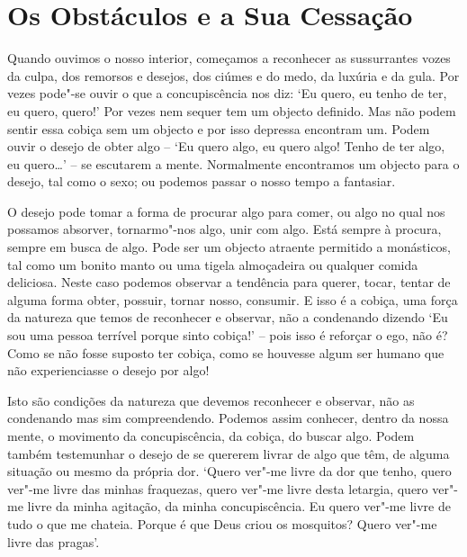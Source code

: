 \chapter{Os Obstáculos e a Sua Cessação}

Quando ouvimos o nosso interior, começamos a reconhecer as sussurrantes
vozes da culpa, dos remorsos e desejos, dos ciúmes e do medo, da luxúria
e da gula. Por vezes pode"-se ouvir o que a concupiscência nos diz: `Eu
quero, eu tenho de ter, eu quero, quero!' Por vezes nem sequer tem um
objecto definido. Mas não podem sentir essa cobiça sem um objecto e por
isso depressa encontram um. Podem ouvir o desejo de obter algo -- `Eu
quero algo, eu quero algo! Tenho de ter algo, eu quero\ldots{}' -- se
escutarem a mente. Normalmente encontramos um objecto para o desejo, tal
como o sexo; ou podemos passar o nosso tempo a fantasiar.

O desejo pode tomar a forma de procurar algo para comer, ou algo no qual
nos possamos absorver, tornarmo"-nos algo, unir com algo. Está sempre à
procura, sempre em busca de algo. Pode ser um objecto atraente permitido
a monásticos, tal como um bonito manto ou uma tigela almoçadeira ou
qualquer comida deliciosa. Neste caso podemos observar a tendência para
querer, tocar, tentar de alguma forma obter, possuir, tornar nosso,
consumir. E isso é a cobiça, uma força da natureza que temos de
reconhecer e observar, não a condenando dizendo `Eu sou uma pessoa 
terrível porque sinto cobiça!' -- pois isso é reforçar o ego, não é? 
Como se não fosse suposto ter cobiça, como se houvesse algum ser humano 
que não experienciasse o desejo por algo!

Isto são condições da natureza que devemos reconhecer e
observar, não as condenando mas sim compreendendo. Podemos
assim conhecer, dentro da nossa mente, o movimento da concupiscência, da
cobiça, do buscar algo. Podem também testemunhar o desejo de se quererem
livrar de algo que têm, de alguma situação ou mesmo da própria dor.
`Quero ver"-me livre da dor que tenho, quero ver"-me livre das minhas
fraquezas, quero ver"-me livre desta letargia, quero ver"-me livre da
minha agitação, da minha concupiscência. Eu quero ver"-me livre de tudo o
que me chateia. Porque é que Deus criou os mosquitos? Quero ver"-me livre
das pragas'.

